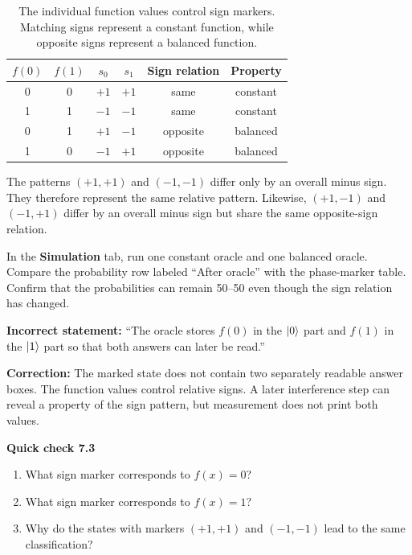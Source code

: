 \begin{table}[t]
\centering
\begin{tabular}{cccccc}
\toprule
$f(0)$ & $f(1)$ & $s_0$ & $s_1$ & Sign relation & Property \\
\midrule
0 & 0 & $+1$ & $+1$ & same & constant \\
1 & 1 & $-1$ & $-1$ & same & constant \\
0 & 1 & $+1$ & $-1$ & opposite & balanced \\
1 & 0 & $-1$ & $+1$ & opposite & balanced \\
\bottomrule
\end{tabular}
\caption{The individual function values control sign markers. Matching signs represent a constant function, while opposite signs represent a balanced function.}
\label{tab:ch07-marker-patterns}
\end{table}

The patterns $(+1,+1)$ and $(-1,-1)$ differ only by an overall minus sign. They therefore represent the same relative pattern. Likewise, $(+1,-1)$ and $(-1,+1)$ differ by an overall minus sign but share the same opposite-sign relation.

\begin{appactivity}
In the \textbf{Simulation} tab, run one constant oracle and one balanced oracle. Compare the probability row labeled ``After oracle'' with the phase-marker table. Confirm that the probabilities can remain 50--50 even though the sign relation has changed.
\end{appactivity}

\begin{misconception}
\textbf{Incorrect statement:} ``The oracle stores $f(0)$ in the $\ket{0}$ part and $f(1)$ in the $\ket{1}$ part so that both answers can later be read.''

\medskip
\textbf{Correction:} The marked state does not contain two separately readable answer boxes. The function values control relative signs. A later interference step can reveal a property of the sign pattern, but measurement does not print both values.
\end{misconception}

\begin{checkpoint}
\textbf{Quick check 7.3}
\begin{enumerate}
  \item What sign marker corresponds to $f(x)=0$?
  \item What sign marker corresponds to $f(x)=1$?
  \item Why do the states with markers $(+1,+1)$ and $(-1,-1)$ lead to the same classification?
\end{enumerate}
\end{checkpoint}

